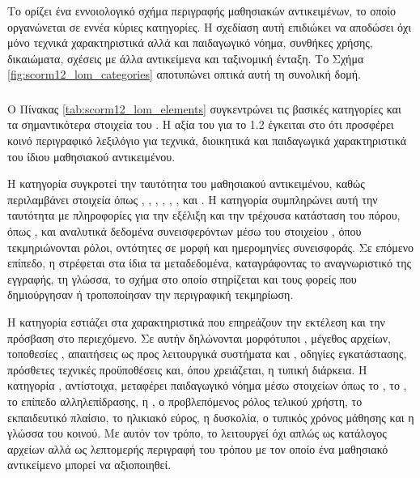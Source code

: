 \subsubsection{  }

Το   ορίζει ένα εννοιολογικό σχήμα περιγραφής μαθησιακών αντικειμένων, το οποίο οργανώνεται σε εννέα κύριες κατηγορίες. Η σχεδίαση αυτή επιδιώκει να αποδώσει όχι μόνο τεχνικά χαρακτηριστικά αλλά και παιδαγωγικό νόημα, συνθήκες χρήσης, δικαιώματα, σχέσεις με άλλα αντικείμενα και ταξινομική ένταξη. Το Σχήμα \ref{fig:scorm12_lom_categories} αποτυπώνει οπτικά αυτή τη συνολική δομή.



\subsubsection{  }

Ο Πίνακας \ref{tab:scorm12_lom_elements} συγκεντρώνει τις βασικές κατηγορίες και τα σημαντικότερα στοιχεία του . Η αξία του  για το  1.2 έγκειται στο ότι προσφέρει κοινό περιγραφικό λεξιλόγιο για τεχνικά, διοικητικά και παιδαγωγικά χαρακτηριστικά του ίδιου μαθησιακού αντικειμένου.



Η κατηγορία  συγκροτεί την ταυτότητα του μαθησιακού αντικειμένου, καθώς περιλαμβάνει στοιχεία όπως , , , , , ,  και . Η  κατηγορία συμπληρώνει αυτή την ταυτότητα με πληροφορίες για την εξέλιξη και την τρέχουσα κατάσταση του πόρου, όπως ,  και αναλυτικά δεδομένα συνεισφερόντων μέσω του στοιχείου , όπου τεκμηριώνονται ρόλοι, οντότητες σε μορφή  και ημερομηνίες συνεισφοράς. Σε επόμενο επίπεδο, η  στρέφεται στα ίδια τα μεταδεδομένα, καταγράφοντας το αναγνωριστικό της εγγραφής, τη γλώσσα, το σχήμα στο οποίο στηρίζεται και τους φορείς που δημιούργησαν ή τροποποίησαν την περιγραφική τεκμηρίωση.

Η κατηγορία  εστιάζει στα χαρακτηριστικά που επηρεάζουν την εκτέλεση και την πρόσβαση στο περιεχόμενο. Σε αυτήν δηλώνονται μορφότυποι , μέγεθος αρχείων, τοποθεσίες , απαιτήσεις ως προς λειτουργικά συστήματα και , οδηγίες εγκατάστασης, πρόσθετες τεχνικές προϋποθέσεις και, όπου χρειάζεται, η τυπική διάρκεια. Η κατηγορία , αντίστοιχα, μεταφέρει παιδαγωγικό νόημα μέσω στοιχείων όπως το , το , το επίπεδο αλληλεπίδρασης, η , ο προβλεπόμενος ρόλος τελικού χρήστη, το εκπαιδευτικό πλαίσιο, το ηλικιακό εύρος, η δυσκολία, ο τυπικός χρόνος μάθησης και η γλώσσα του κοινού. Με αυτόν τον τρόπο, το  λειτουργεί όχι απλώς ως κατάλογος αρχείων αλλά ως λεπτομερής περιγραφή του τρόπου με τον οποίο ένα μαθησιακό αντικείμενο μπορεί να αξιοποιηθεί.

